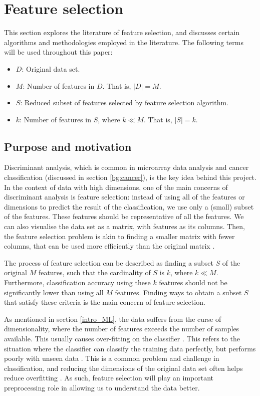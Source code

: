 \documentclass[12pt, twoside, a4paper]{report}
\begin{document}
\section{Feature selection} \label{bg:feature_selection}

This section explores the literature of feature selection, and discusses certain algorithms and methodologies employed in the literature. The following terms will be used throughout this paper:
\begin{itemize}
  \item $D$: Original data set.
  \item $M$: Number of features in $D$. That is, $|D| = M$.
  \item $S$: Reduced subset of features selected by feature selection algorithm.
  \item $k$: Number of features in $S$, where $k \ll M$. That is, $|S| = k$.
\end{itemize}

\subsection{Purpose and motivation} \label{bg:fs:purpose}

Discriminant analysis, which is common in microarray data analysis and cancer classification (discussed in section \ref{bg:cancer}), is the key idea behind this project. In the context of data with high dimensions, one of the main concerns of discriminant analysis is feature selection: instead of using all of the features or dimensions to predict the result of the classification, we use only a (small) subset of the features. These features should be representative of all the features. We can also visualise the data set as a matrix, with features as its columns. Then, the feature selection problem is akin to finding a smaller matrix with fewer columns, that can be used more efficiently than the original matrix \cite{RefWorks:163}.

The process of feature selection can be described as finding a subset $S$ of the original $M$ features, such that the cardinality of $S$ is $k$, where $k \ll M$. Furthermore, classification accuracy using these $k$ features should not be significantly lower than using all $M$ features. Finding ways to obtain a subset $S$ that satisfy these criteria is the main concern of feature selection.

As mentioned in section \ref{intro_ML}, the data suffers from the curse of dimensionality, where the number of features exceeds the number of samples available. This usually causes over-fitting on the classifier \cite{RefWorks:115, RefWorks:175}. This refers to the situation where the classifier can classify the training data perfectly, but performs poorly with unseen data \cite{RefWorks:98}. This is a common problem and challenge in classification, and reducing the dimensions of the original data set often helps reduce overfitting \cite{RefWorks:228}. As such, feature selection will play an important preprocessing role in allowing us to understand the data better.
\end{document}
